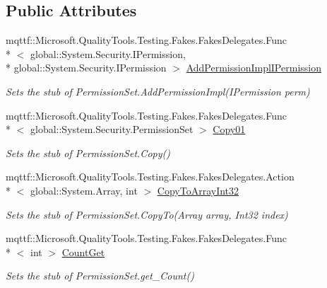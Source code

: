 \subsection*{Public Attributes}
\begin{DoxyCompactItemize}
\item 
mqttf\-::\-Microsoft.\-Quality\-Tools.\-Testing.\-Fakes.\-Fakes\-Delegates.\-Func\\*
$<$ global\-::\-System.\-Security.\-I\-Permission, \\*
global\-::\-System.\-Security.\-I\-Permission $>$ \hyperlink{class_system_1_1_security_1_1_fakes_1_1_stub_permission_set_a76c1f16f0b336d28610a3219e664daa6}{Add\-Permission\-Impl\-I\-Permission}
\begin{DoxyCompactList}\small\item\em Sets the stub of Permission\-Set.\-Add\-Permission\-Impl(\-I\-Permission perm)\end{DoxyCompactList}\item 
mqttf\-::\-Microsoft.\-Quality\-Tools.\-Testing.\-Fakes.\-Fakes\-Delegates.\-Func\\*
$<$ global\-::\-System.\-Security.\-Permission\-Set $>$ \hyperlink{class_system_1_1_security_1_1_fakes_1_1_stub_permission_set_aba7e5295875fcd5cc9577d2212530ac8}{Copy01}
\begin{DoxyCompactList}\small\item\em Sets the stub of Permission\-Set.\-Copy()\end{DoxyCompactList}\item 
mqttf\-::\-Microsoft.\-Quality\-Tools.\-Testing.\-Fakes.\-Fakes\-Delegates.\-Action\\*
$<$ global\-::\-System.\-Array, int $>$ \hyperlink{class_system_1_1_security_1_1_fakes_1_1_stub_permission_set_a59fc1436a7942ba4a548d53b568c4f26}{Copy\-To\-Array\-Int32}
\begin{DoxyCompactList}\small\item\em Sets the stub of Permission\-Set.\-Copy\-To(\-Array array, Int32 index)\end{DoxyCompactList}\item 
mqttf\-::\-Microsoft.\-Quality\-Tools.\-Testing.\-Fakes.\-Fakes\-Delegates.\-Func\\*
$<$ int $>$ \hyperlink{class_system_1_1_security_1_1_fakes_1_1_stub_permission_set_ab189da8e31bd2a1ed4ad75b116fd453d}{Count\-Get}
\begin{DoxyCompactList}\small\item\em Sets the stub of Permission\-Set.\-get\-\_\-\-Count()\end{DoxyCompactList}\item 

\end{DoxyCompactItemize}
